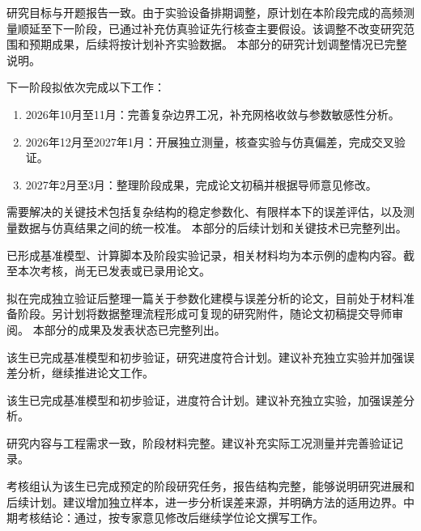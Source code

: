\begin{workplan}
\begin{bxfsm}
研究目标与开题报告一致。由于实验设备排期调整，原计划在本阶段完成的高频测量顺延至下一阶段，已通过补充仿真验证先行核查主要假设。该调整不改变研究范围和预期成果，后续将按计划补齐实验数据。
本部分的研究计划调整情况已完整说明。
\end{bxfsm}
\begin{gzhjh}
下一阶段拟依次完成以下工作：
\begin{enumerate}
  \item 2026年10月至11月：完善复杂边界工况，补充网格收敛与参数敏感性分析。
  \item 2026年12月至2027年1月：开展独立测量，核查实验与仿真偏差，完成交叉验证。
  \item 2027年2月至3月：整理阶段成果，完成论文初稿并根据导师意见修改。
\end{enumerate}
需要解决的关键技术包括复杂结构的稳定参数化、有限样本下的误差评估，以及测量数据与仿真结果之间的统一校准。
本部分的后续计划和关键技术已完整列出。
\end{gzhjh}
\begin{kycg}
已形成基准模型、计算脚本及阶段实验记录，相关材料均为本示例的虚构内容。截至本次考核，尚无已发表或已录用论文。

拟在完成独立验证后整理一篇关于参数化建模与误差分析的论文，目前处于材料准备阶段。另计划将数据整理流程形成可复现的研究附件，随论文初稿提交导师审阅。
本部分的成果及发表状态已完整列出。
\end{kycg}
\end{workplan}

\ifadegree
\begin{jsyj}
该生已完成基准模型和初步验证，研究进度符合计划。建议补充独立实验并加强误差分析，继续推进论文工作。
\end{jsyj}
\else
\begin{xnjsyj}
该生已完成基准模型和初步验证，进度符合计划。建议补充独立实验，加强误差分析。
\end{xnjsyj}
\begin{xyjsyj}
研究内容与工程需求一致，阶段材料完整。建议补充实际工况测量并完善验证记录。
\end{xyjsyj}
\fi

\begin{pyjl}
考核组认为该生已完成预定的阶段研究任务，报告结构完整，能够说明研究进展和后续计划。建议增加独立样本，进一步分析误差来源，并明确方法的适用边界。中期考核结论：通过，按专家意见修改后继续学位论文撰写工作。
\end{pyjl}

